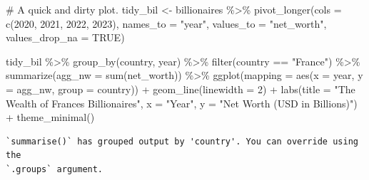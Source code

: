 \documentclass[
  letterpaper,
]{book}
\newenvironment{Shaded}{\begin{snugshade}}{\end{snugshade}}
\newcommand{\AttributeTok}[1]{\textcolor[rgb]{0.40,0.45,0.13}{#1}}
\newcommand{\CommentTok}[1]{\textcolor[rgb]{0.37,0.37,0.37}{#1}}
\newcommand{\ConstantTok}[1]{\textcolor[rgb]{0.56,0.35,0.01}{#1}}
\newcommand{\DecValTok}[1]{\textcolor[rgb]{0.68,0.00,0.00}{#1}}
\newcommand{\FunctionTok}[1]{\textcolor[rgb]{0.28,0.35,0.67}{#1}}
\newcommand{\NormalTok}[1]{\textcolor[rgb]{0.00,0.23,0.31}{#1}}
\newcommand{\OtherTok}[1]{\textcolor[rgb]{0.00,0.23,0.31}{#1}}
\newcommand{\SpecialCharTok}[1]{\textcolor[rgb]{0.37,0.37,0.37}{#1}}
\newcommand{\StringTok}[1]{\textcolor[rgb]{0.13,0.47,0.30}{#1}}
\begin{document}
\begin{Shaded}
\begin{Highlighting}[]
\CommentTok{\# A quick and dirty plot.}
\NormalTok{tidy\_bil }\OtherTok{\textless{}{-}}\NormalTok{ billionaires }\SpecialCharTok{\%\textgreater{}\%}
  \FunctionTok{pivot\_longer}\NormalTok{(}\AttributeTok{cols =} \FunctionTok{c}\NormalTok{(}\StringTok{\textasciigrave{}}\AttributeTok{2020}\StringTok{\textasciigrave{}}\NormalTok{, }\StringTok{\textasciigrave{}}\AttributeTok{2021}\StringTok{\textasciigrave{}}\NormalTok{, }\StringTok{\textasciigrave{}}\AttributeTok{2022}\StringTok{\textasciigrave{}}\NormalTok{, }\StringTok{\textasciigrave{}}\AttributeTok{2023}\StringTok{\textasciigrave{}}\NormalTok{),}
               \AttributeTok{names\_to =} \StringTok{"year"}\NormalTok{,}
               \AttributeTok{values\_to =} \StringTok{"net\_worth"}\NormalTok{,}
               \AttributeTok{values\_drop\_na =} \ConstantTok{TRUE}\NormalTok{)}

\NormalTok{tidy\_bil }\SpecialCharTok{\%\textgreater{}\%}
  \FunctionTok{group\_by}\NormalTok{(country, year) }\SpecialCharTok{\%\textgreater{}\%}
  \FunctionTok{filter}\NormalTok{(country }\SpecialCharTok{==} \StringTok{"France"}\NormalTok{) }\SpecialCharTok{\%\textgreater{}\%}
  \FunctionTok{summarize}\NormalTok{(}\AttributeTok{agg\_nw =} \FunctionTok{sum}\NormalTok{(net\_worth)) }\SpecialCharTok{\%\textgreater{}\%}
  \FunctionTok{ggplot}\NormalTok{(}\AttributeTok{mapping =} \FunctionTok{aes}\NormalTok{(}\AttributeTok{x =}\NormalTok{ year, }\AttributeTok{y =}\NormalTok{ agg\_nw, }\AttributeTok{group =}\NormalTok{ country)) }\SpecialCharTok{+} 
  \FunctionTok{geom\_line}\NormalTok{(}\AttributeTok{linewidth =} \DecValTok{2}\NormalTok{) }\SpecialCharTok{+}
  \FunctionTok{labs}\NormalTok{(}\AttributeTok{title =} \StringTok{"The Wealth of France\textquotesingle{}s Billionaires"}\NormalTok{,}
       \AttributeTok{x =} \StringTok{"Year"}\NormalTok{,}
       \AttributeTok{y =} \StringTok{"Net Worth (USD in Billions)"}\NormalTok{) }\SpecialCharTok{+} 
  \FunctionTok{theme\_minimal}\NormalTok{()}
\end{Highlighting}
\end{Shaded}

\begin{verbatim}
`summarise()` has grouped output by 'country'. You can override using the
`.groups` argument.
\end{verbatim}
\end{document}
